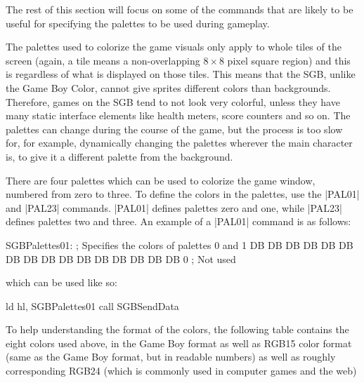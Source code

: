 \documentclass[11pt]{book}
\begin{document}
The rest of this section will focus on some of the commands that are likely to be useful for specifying the palettes to be used during gameplay.

The palettes used to colorize the game visuals only apply to whole tiles of the screen (again, a tile means a non-overlapping $8 \times 8$ pixel square region) and this is regardless of what is displayed on those tiles. This means that the SGB, unlike the Game Boy Color, cannot give sprites different colors than backgrounds. Therefore, games on the SGB tend to not look very colorful, unless they have many static interface elements like health meters, score counters and so on. The palettes can change during the course of the game, but the process is too slow for, for example, dynamically changing the palettes wherever the main character is, to give it a different palette from the background. 

There are four palettes which can be used to colorize the game window, numbered from zero to three. To define the colors in the palettes, use the |PAL01| and |PAL23| commands. |PAL01| defines palettes zero and one, while |PAL23| defines palettes two and three. An example of a |PAL01| command is as follows:

\begin{code}
SGBPalettes01: ; Specifies the colors of palettes 0 and 1
DB %
DB %
DB %
DB %
DB %
DB %
DB %
DB %
DB %
DB %
DB %
DB %
DB %
DB %
DB %
DB 0         ; Not used 
\end{code}

which can be used like so:

\begin{code}
ld hl, SGBPalettes01
call SGBSendData
\end{code}



To help understanding the format of the colors, the following table contains the eight colors used above, in the Game Boy format as well as RGB15 color format (same as the Game Boy format, but in readable numbers) as well as roughly corresponding RGB24 (which is commonly used in computer games and the web)
\end{document}
